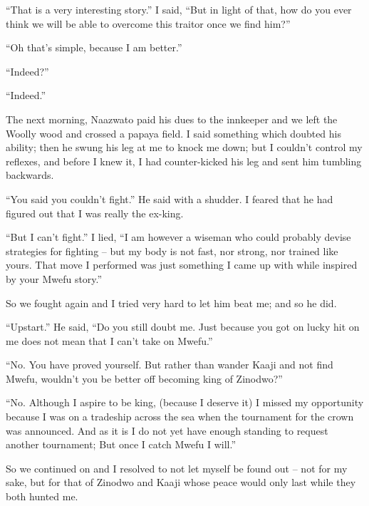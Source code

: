 ``That is a very interesting story.'' I said, ``But in light of that, how do you ever think we will be able to overcome this traitor once we find him?''

``Oh that's simple, because I am better.''

``Indeed?''

``Indeed.''

\tbreak

The next morning, Naazwato paid his dues to the innkeeper and we left the Woolly wood and crossed a papaya field. I said something which doubted his ability; then he swung his leg at me to knock me down; but I couldn't control my reflexes, and before I knew it, I had counter-kicked his leg and sent him tumbling backwards.

``You said you couldn't fight.'' He said with a shudder. I feared that he had figured out that I was really the ex-king.

``But I can't fight.'' I lied, ``I am however a wiseman who could probably devise strategies for fighting -- but my body is not fast, nor strong, nor trained like yours. That move I performed was just something I came up with while inspired by your Mwefu story.''

So we fought again and I tried very hard to let him beat me; and so he did.

``Upstart.'' He said, ``Do you still doubt me. Just because you got on lucky hit on me does not mean that I can't take on Mwefu.''

``No. You have proved yourself. But rather than wander Kaaji and not find Mwefu, wouldn't you be better off becoming king of Zinodwo?''

``No. Although I aspire to be king, (because I deserve it) I missed my opportunity because I was on a tradeship across the sea when the tournament for the crown was announced. And as it is I do not yet have enough standing to request another tournament; But once I catch Mwefu I will.''

So we continued on and I resolved to not let myself be found out -- not for my sake, but for that of Zinodwo and Kaaji whose peace would only last while they both hunted me.
